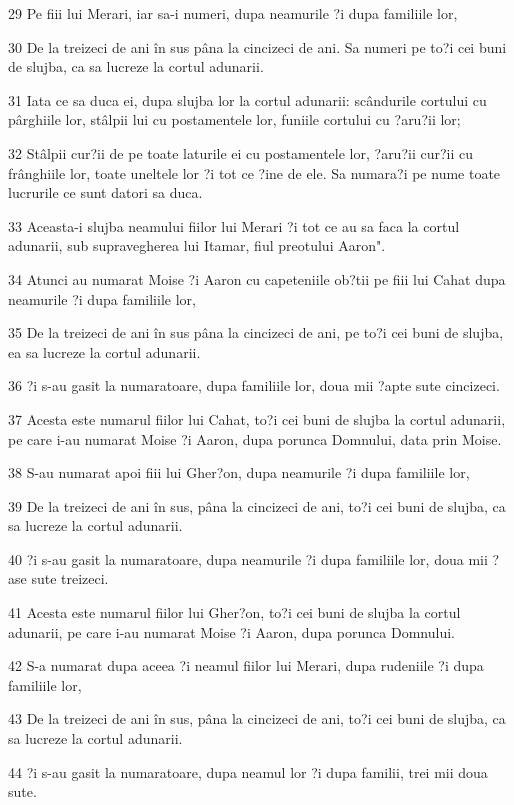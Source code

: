 \par 29 Pe fiii lui Merari, iar sa-i numeri, dupa neamurile ?i dupa familiile lor,
\par 30 De la treizeci de ani în sus pâna la cincizeci de ani. Sa numeri pe to?i cei buni de slujba, ca sa lucreze la cortul adunarii.
\par 31 Iata ce sa duca ei, dupa slujba lor la cortul adunarii: scândurile cortului cu pârghiile lor, stâlpii lui cu postamentele lor, funiile cortului cu ?aru?ii lor;
\par 32 Stâlpii cur?ii de pe toate laturile ei cu postamentele lor, ?aru?ii cur?ii cu frânghiile lor, toate uneltele lor ?i tot ce ?ine de ele. Sa numara?i pe nume toate lucrurile ce sunt datori sa duca.
\par 33 Aceasta-i slujba neamului fiilor lui Merari ?i tot ce au sa faca la cortul adunarii, sub supravegherea lui Itamar, fiul preotului Aaron".
\par 34 Atunci au numarat Moise ?i Aaron cu capeteniile ob?tii pe fiii lui Cahat dupa neamurile ?i dupa familiile lor,
\par 35 De la treizeci de ani în sus pâna la cincizeci de ani, pe to?i cei buni de slujba, ea sa lucreze la cortul adunarii.
\par 36 ?i s-au gasit la numaratoare, dupa familiile lor, doua mii ?apte sute cincizeci.
\par 37 Acesta este numarul fiilor lui Cahat, to?i cei buni de slujba la cortul adunarii, pe care i-au numarat Moise ?i Aaron, dupa porunca Domnului, data prin Moise.
\par 38 S-au numarat apoi fiii lui Gher?on, dupa neamurile ?i dupa familiile lor,
\par 39 De la treizeci de ani în sus, pâna la cincizeci de ani, to?i cei buni de slujba, ca sa lucreze la cortul adunarii.
\par 40 ?i s-au gasit la numaratoare, dupa neamurile ?i dupa familiile lor, doua mii ?ase sute treizeci.
\par 41 Acesta este numarul fiilor lui Gher?on, to?i cei buni de slujba la cortul adunarii, pe care i-au numarat Moise ?i Aaron, dupa porunca Domnului.
\par 42 S-a numarat dupa aceea ?i neamul fiilor lui Merari, dupa rudeniile ?i dupa familiile lor,
\par 43 De la treizeci de ani în sus, pâna la cincizeci de ani, to?i cei buni de slujba, ca sa lucreze la cortul adunarii.
\par 44 ?i s-au gasit la numaratoare, dupa neamul lor ?i dupa familii, trei mii doua sute.
